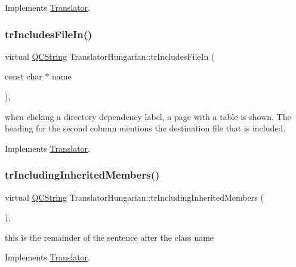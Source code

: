 Implements \mbox{\hyperlink{class_translator}{Translator}}.

\mbox{\label{class_translator_hungarian_a32059226622a70505487773f815e11ff}} 
\subsubsection{\texorpdfstring{trIncludesFileIn()}{trIncludesFileIn()}}
{\footnotesize\ttfamily virtual \mbox{\hyperlink{class_q_c_string}{Q\+C\+String}} Translator\+Hungarian\+::tr\+Includes\+File\+In (\begin{DoxyParamCaption}\item[{const char $\ast$}]{name }\end{DoxyParamCaption})\hspace{0.3cm}{\ttfamily [inline]}, {\ttfamily [virtual]}}

when clicking a directory dependency label, a page with a table is shown. The heading for the second column mentions the destination file that is included. 

Implements \mbox{\hyperlink{class_translator}{Translator}}.

\mbox{\label{class_translator_hungarian_a75d77992ac713e2897fd57798d09e43e}} 
\subsubsection{\texorpdfstring{trIncludingInheritedMembers()}{trIncludingInheritedMembers()}}
{\footnotesize\ttfamily virtual \mbox{\hyperlink{class_q_c_string}{Q\+C\+String}} Translator\+Hungarian\+::tr\+Including\+Inherited\+Members (\begin{DoxyParamCaption}{ }\end{DoxyParamCaption})\hspace{0.3cm}{\ttfamily [inline]}, {\ttfamily [virtual]}}

this is the remainder of the sentence after the class name 

Implements \mbox{\hyperlink{class_translator}{Translator}}.

